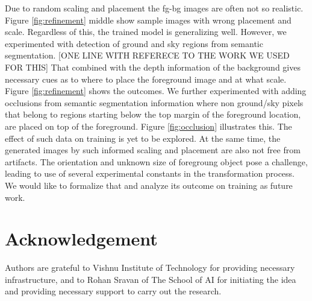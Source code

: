 \documentclass[review]{cvpr}
\begin{document}
Due to random scaling and placement the fg-bg images are often not so realistic. Figure \ref{fig:refinement} middle show sample images with wrong placement and scale. Regardless of this, the trained model is generalizing well. However, we experimented with detection of ground and sky regions from semantic segmentation. [ONE LINE WITH REFERECE TO THE WORK WE USED FOR THIS] That combined with the depth information of the background gives necessary cues as to where to place the foreground image and at what scale. Figure \ref{fig:refinement} shows the outcomes. We further experimented with adding occlusions from semantic segmentation information where non ground/sky pixels that belong to regions starting below the top margin of the foreground location, are placed on top of the foreground. Figure \ref{fig:occlusion} illustrates this. The effect of such data on training is yet to be explored. At the same time, the generated images by such informed scaling and placement are also not free from artifacts. The orientation and unknown size of foregroung object pose a challenge, leading to use of several experimental constants in the transformation process. We would like to formalize that and analyze its outcome on training as future work.

\section{Acknowledgement}
Authors are grateful to Vishnu Institute of Technology for providing necessary infrastructure, and to Rohan Sravan of The School of AI for initiating the idea and providing necessary support to carry out the research.

{\small


}
\end{document}
